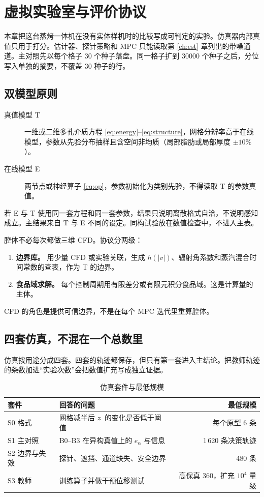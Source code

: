 \chapter{虚拟实验室与评价协议}
\label{ch:sim}

本章把这台蒸烤一体机在没有实体样机时的比较写成可判定的实验。仿真器内部真值只用于打分。估计器、探针策略和 MPC 只能读取第 \ref{ch:est} 章列出的带噪通道。主对照先以每个格子 30 个种子落盘。同一格子扩到 30000 个种子之后，分位写入单独的摘要，不覆盖 30 种子的行。

\section{双模型原则}

\begin{description}
\item[真值模型 T] 一维或二维多孔介质方程 \eqref{eq:energy}--\eqref{eq:structure}，网格分辨率高于在线模型，参数从先验分布抽样且含空间非均质（局部脂肪或局部厚度 $\pm 10\%$）。
\item[在线模型 E] 两节点或神经算子 \eqref{eq:op}，参数初始化为类别先验，不得读取 T 的参数真值。
\end{description}

若 E 与 T 使用同一套方程和同一套参数，结果只说明离散格式自洽，不说明感知成立。主结果来自 T 与 E 不同的设定。同构试验放在数值检查中，不进入主表。

腔体不必每次都做三维 CFD。协议分两级：

\begin{enumerate}
\item \textbf{边界库。} 用少量 CFD 或实验关联，生成 $h(|v|)$、辐射角系数和蒸汽混合时间常数的查表，作为 T 的边界。
\item \textbf{食品域求解。} 每个控制周期用有限差分或有限元积分食品域。这是计算量的主体。
\end{enumerate}

CFD 的角色是提供可信边界，不是在每个 MPC 迭代里重算腔体。

\section{四套仿真，不混在一个总数里}

仿真按用途分成四套。四套的轨迹都保存，但只有第一套进入主结论。把教师轨迹的条数加进“实验次数”会把数值扩充写成独立证据。

\begin{table}[H]
\centering
\caption{仿真套件与最低规模}
\begin{tabularx}{\textwidth}{lXr}
\toprule
套件 & 回答的问题 & 最低规模 \\
\midrule
S0 格式 & 网格减半后 $\bm{z}$ 的变化是否低于阈值 & 每个原型 6 条 \\
S1 主对照 & B0--B3 在异构真值上的 $e_{\alpha}$ 与信息 & 1\,620 条决策轨迹 \\
S2 边界与失效 & 探针、遮挡、通道缺失、安全边界 & 480 条 \\
S3 教师 & 训练算子并做干预位移测试 & 高保真 360，扩充 $10^4$ 量级 \\
\bottomrule
\end{tabularx}
\end{table}

